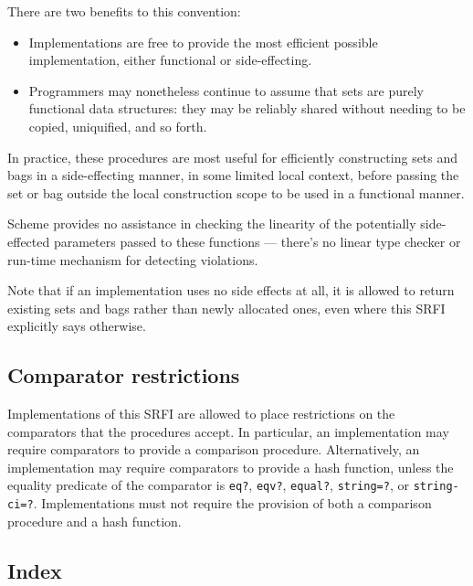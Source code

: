 There are two benefits to this convention:

\begin{itemize}
\item
  Implementations are free to provide the most efficient possible
  implementation, either functional or side-effecting.
\item
  Programmers may nonetheless continue to assume that sets are purely
  functional data structures: they may be reliably shared without
  needing to be copied, uniquified, and so forth.
\end{itemize}

In practice, these procedures are most useful for efficiently
constructing sets and bags in a side-effecting manner, in some limited
local context, before passing the set or bag outside the local
construction scope to be used in a functional manner.

Scheme provides no assistance in checking the linearity of the
potentially side-effected parameters passed to these functions ---
there's no linear type checker or run-time mechanism for detecting
violations.

Note that if an implementation uses no side effects at all, it is
allowed to return existing sets and bags rather than newly allocated
ones, even where this SRFI explicitly says otherwise.

\subsection{Comparator restrictions}

Implementations of this SRFI are allowed to place restrictions on the
comparators that the procedures accept. In particular, an implementation
may require comparators to provide a comparison procedure.
Alternatively, an implementation may require comparators to provide a
hash function, unless the equality predicate of the comparator is
\texttt{eq?}, \texttt{eqv?}, \texttt{equal?}, \texttt{string=?}, or
\texttt{string-ci=?}. Implementations must not require the provision of
both a comparison procedure and a hash function.

\subsection{Index}\label{Index}

